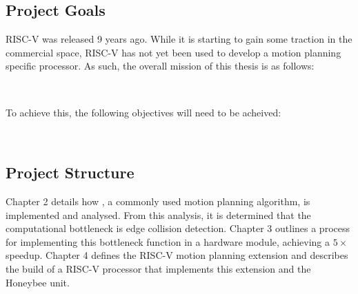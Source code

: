 
\subsection{Project Goals}
RISC-V was released 9 years ago. While it is starting to gain some traction in the commercial space, RISC-V has not yet been used to develop a motion planning specific processor. As such, the overall mission of this thesis is as follows:

\begin{center}
\bigskip\noindent{} \\
\end{center}

\noindent To achieve this, the following objectives will need to be acheived:

\begin{center}
\bigskip\noindent{} \\
\end{center}

\subsection{Project Structure}
    Chapter 2 details how , a commonly used motion planning algorithm, is implemented and analysed. From this analysis, it is determined that the computational bottleneck is edge collision detection. Chapter 3 outlines a process for implementing this bottleneck function in a hardware module, achieving a $5 \times$ speedup. Chapter 4 defines the RISC-V  motion planning extension and describes the build of a RISC-V processor that implements this extension and the Honeybee unit.

